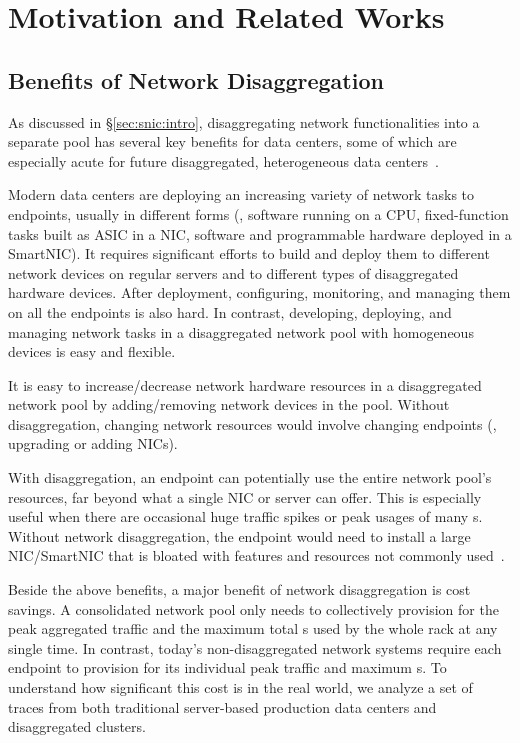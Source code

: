 \section{Motivation and Related Works}
\label{sec:snic:motivation}

\subsection{Benefits of Network Disaggregation}
\label{sec:snic:benefits}
As discussed in \S\ref{sec:snic:intro}, disaggregating network functionalities into a separate pool has several key benefits for data centers, some of which are especially acute for future disaggregated, heterogeneous data centers~\cite{LegoOS,last-cpu-hotos, FratOS-eurosys}.

Modern data centers are deploying an increasing variety of network tasks to endpoints, usually in different forms (\eg, software running on a CPU, fixed-function tasks built as ASIC in a NIC, software and programmable hardware deployed in a SmartNIC). 
It requires significant efforts to build and deploy them to different network devices on regular servers and to different types of disaggregated hardware devices.
After deployment, configuring, monitoring, and managing them on all the endpoints is also hard.
In contrast, developing, deploying, and managing network tasks in a disaggregated network pool with homogeneous devices is easy and flexible.

It is easy to increase/decrease network hardware resources in a disaggregated network pool by adding/removing network devices in the pool. Without disaggregation, changing network resources would involve changing endpoints (\eg, upgrading or adding NICs).

With disaggregation, an endpoint can potentially use the entire network pool's resources, far beyond what a single NIC or server can offer.
This is especially useful when there are occasional huge traffic spikes or peak usages of many \nt{}s.
Without network disaggregation, the endpoint would need to install a large NIC/SmartNIC that is bloated with features and resources not commonly used~\cite{SmartNIC-nsdi18,Caulfield-2018}.

Beside the above benefits, a major benefit of network disaggregation is cost savings. A consolidated network pool only needs to collectively provision for the peak aggregated traffic and the maximum total \nt{}s used by the whole rack at any single time.
In contrast, today's non-disaggregated network systems require each endpoint to provision for its individual peak traffic and maximum \nt{}s.
To understand how significant this cost is in the real world, we analyze a set of traces from both traditional server-based production data centers and disaggregated clusters.

